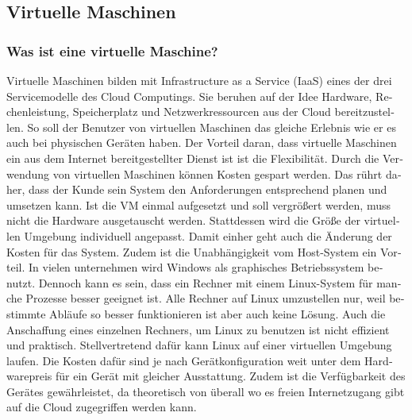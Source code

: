 \begin{otherlanguage}{ngerman}
\subsection{Virtuelle Maschinen}
\subsubsection{Was ist eine virtuelle Maschine?}
Virtuelle Maschinen bilden mit Infrastructure as a Service (IaaS) eines der drei Servicemodelle des Cloud Computings. Sie beruhen auf der Idee Hardware, Rechenleistung, Speicherplatz und Netzwerkressourcen aus der Cloud bereitzustellen. So soll der Benutzer von virtuellen Maschinen das gleiche Erlebnis wie er es auch bei physischen Geräten haben. 
\newline 
\newline
Der Vorteil daran, dass virtuelle Maschinen ein aus dem Internet bereitgestellter Dienst ist ist die Flexibilität. Durch die Verwendung von virtuellen Maschinen können Kosten gespart werden. Das rührt daher, dass der Kunde sein System den Anforderungen entsprechend planen und umsetzen kann. Ist die VM einmal aufgesetzt und soll vergrößert werden, muss nicht die Hardware ausgetauscht werden. Stattdessen wird die Größe der virtuellen Umgebung individuell angepasst. Damit einher geht auch die Änderung der Kosten für das System. 
\newline 
Zudem ist die Unabhängigkeit vom Host-System ein Vorteil. In vielen unternehmen wird Windows als graphisches Betriebssystem benutzt. Dennoch kann es sein, dass ein Rechner mit einem Linux-System für manche Prozesse besser geeignet ist. Alle Rechner auf Linux umzustellen nur, weil bestimmte Abläufe so besser funktionieren ist aber auch keine Lösung. Auch die Anschaffung eines einzelnen Rechners, um Linux zu benutzen ist nicht effizient und praktisch. Stellvertretend dafür kann Linux auf einer virtuellen Umgebung laufen. Die Kosten dafür sind je nach Gerätkonfiguration weit unter dem Hardwarepreis für ein Gerät mit gleicher Ausstattung. Zudem ist die Verfügbarkeit des Gerätes gewährleistet, da theoretisch von überall wo es freien Internetzugang gibt auf die Cloud zugegriffen werden kann. 




\end{otherlanguage}
